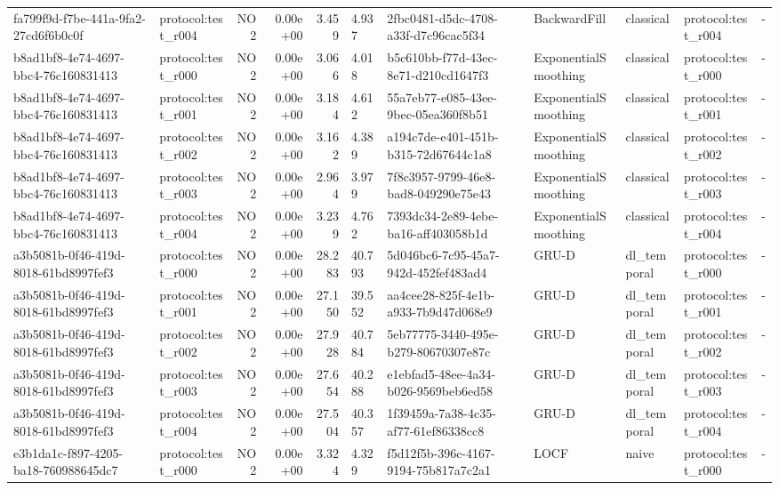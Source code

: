 \begin{table}[htbp]
\begin{tabular}{llrrr}
fa799f9d-f7be-441a-9fa2-27cd6f6b0c0f & protocol:test\_r004 & NO2 & 0.00e+00 & 3.459 & 4.937 & 2fbc0481-d5dc-4708-a33f-d7c96cac5f34 & BackwardFill & classical & protocol:test\_r004 & - \\
b8ad1bf8-4e74-4697-bbc4-76c160831413 & protocol:test\_r000 & NO2 & 0.00e+00 & 3.066 & 4.018 & b5c610bb-f77d-43ec-8e71-d210cd1647f3 & ExponentialSmoothing & classical & protocol:test\_r000 & - \\
b8ad1bf8-4e74-4697-bbc4-76c160831413 & protocol:test\_r001 & NO2 & 0.00e+00 & 3.184 & 4.612 & 55a7eb77-e085-43ee-9bec-05ea360f8b51 & ExponentialSmoothing & classical & protocol:test\_r001 & - \\
b8ad1bf8-4e74-4697-bbc4-76c160831413 & protocol:test\_r002 & NO2 & 0.00e+00 & 3.162 & 4.389 & a194c7de-e401-451b-b315-72d67644c1a8 & ExponentialSmoothing & classical & protocol:test\_r002 & - \\
b8ad1bf8-4e74-4697-bbc4-76c160831413 & protocol:test\_r003 & NO2 & 0.00e+00 & 2.964 & 3.979 & 7f8c3957-9799-46e8-bad8-049290e75e43 & ExponentialSmoothing & classical & protocol:test\_r003 & - \\
b8ad1bf8-4e74-4697-bbc4-76c160831413 & protocol:test\_r004 & NO2 & 0.00e+00 & 3.239 & 4.762 & 7393dc34-2e89-4ebe-ba16-aff403058b1d & ExponentialSmoothing & classical & protocol:test\_r004 & - \\
a3b5081b-0f46-419d-8018-61bd8997fef3 & protocol:test\_r000 & NO2 & 0.00e+00 & 28.283 & 40.793 & 5d046bc6-7c95-45a7-942d-452fef483ad4 & GRU-D & dl\_temporal & protocol:test\_r000 & - \\
a3b5081b-0f46-419d-8018-61bd8997fef3 & protocol:test\_r001 & NO2 & 0.00e+00 & 27.150 & 39.552 & aa4cee28-825f-4e1b-a933-7b9d47d068e9 & GRU-D & dl\_temporal & protocol:test\_r001 & - \\
a3b5081b-0f46-419d-8018-61bd8997fef3 & protocol:test\_r002 & NO2 & 0.00e+00 & 27.928 & 40.784 & 5eb77775-3440-495e-b279-80670307e87c & GRU-D & dl\_temporal & protocol:test\_r002 & - \\
a3b5081b-0f46-419d-8018-61bd8997fef3 & protocol:test\_r003 & NO2 & 0.00e+00 & 27.654 & 40.288 & e1ebfad5-48ee-4a34-b026-9569beb6ed58 & GRU-D & dl\_temporal & protocol:test\_r003 & - \\
a3b5081b-0f46-419d-8018-61bd8997fef3 & protocol:test\_r004 & NO2 & 0.00e+00 & 27.504 & 40.357 & 1f39459a-7a38-4c35-af77-61ef86338cc8 & GRU-D & dl\_temporal & protocol:test\_r004 & - \\
e3b1da1c-f897-4205-ba18-760988645dc7 & protocol:test\_r000 & NO2 & 0.00e+00 & 3.324 & 4.329 & f5d12f5b-396c-4167-9194-75b817a7c2a1 & LOCF & naive & protocol:test\_r000 & - \\

\end{tabular}
\end{table}
